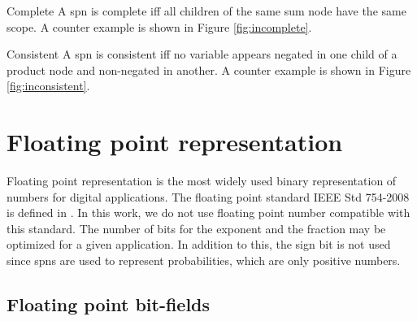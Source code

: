 \begin{definition}{Complete}
A \gls{spn} is complete iff all children of the same sum node have the same scope. A counter example is shown in Figure \ref{fig:incomplete}.
\end{definition}

\begin{definition}{Consistent}
A \gls{spn} is consistent iff no variable appears negated in one child of a product node and non-negated in another. A counter example is shown in Figure \ref{fig:inconsistent}.
\end{definition}

\begin{figure}[!ht]
\begin{mdframed}
	\centering
	\subfloat[incomplete]{ \label{fig:incomplete}}
	\subfloat[inconsistent]{ \label{fig:inconsistent}}
\end{mdframed}
\end{figure}



\section{Floating point representation}

Floating point representation is the most widely used binary representation of numbers for digital applications. The floating point standard IEEE Std 754-2008 is defined in \cite{float_std}. In this work, we do not use floating point number compatible with this standard. The number of bits for the exponent and the fraction may be optimized for a given application. In addition to this, the sign bit is not used since \glspl{spn} are used to represent probabilities, which are only positive numbers.

\subsection{Floating point bit-fields}

